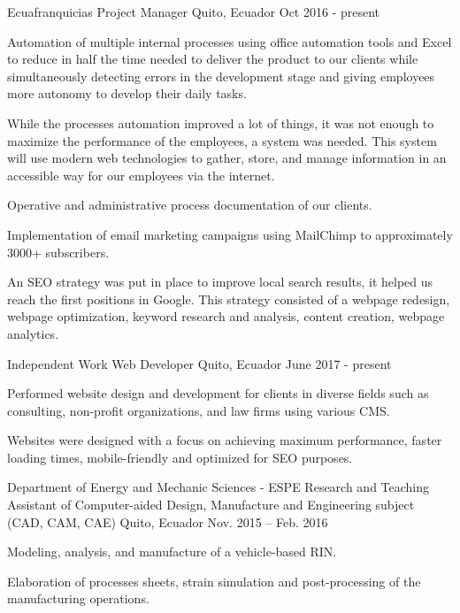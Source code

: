 
\begin{cventries}

  \cventry
    {Ecuafranquicias}
    {Project Manager}
    {Quito, Ecuador}
    {Oct 2016 - present}
    {
      \begin{cvitems}
        \item {Automation of multiple internal processes using oﬀice automation tools and Excel to reduce in half the time needed to deliver the product to our clients while simultaneously detecting errors in the development stage and giving employees more autonomy to develop their daily tasks.}
        \item {While the processes automation improved a lot of things, it was not enough to maximize the performance of the employees, a system was needed. This system will use modern web technologies to gather, store, and manage information in an accessible way for our employees via the internet.}
        \item {Operative and administrative process documentation of our clients.}
        \item {Implementation of email marketing campaigns using MailChimp to approximately 3000+ subscribers.}
        \item {An SEO strategy was put in place to improve local search results, it helped us reach the first positions in Google. This strategy consisted of a webpage redesign, webpage optimization, keyword research and analysis, content creation, webpage analytics.}
      \end{cvitems}
    }

    \cventry
      {Independent Work}
      {Web Developer}
      {Quito, Ecuador}
      {June 2017 - present}
      {
        \begin{cvitems}
          \item {Performed website design and development for clients in diverse fields such as consulting, non-profit organizations, and law firms using various CMS.}
          \item {Websites were designed with a focus on achieving maximum performance, faster loading times, mobile-friendly and optimized for SEO purposes.}                       
        \end{cvitems} 
      }

  \cventry
    {Department of Energy and Mechanic Sciences - ESPE}
    {Research and Teaching Assistant of Computer-aided Design, Manufacture and Engineering subject (CAD, CAM, CAE)	}
    {Quito, Ecuador}
    {Nov. 2015 – Feb. 2016}
    {
      \begin{cvitems}
        \item {Modeling, analysis, and manufacture of a vehicle-based RIN.}
        \item {Elaboration of processes sheets, strain simulation and post-processing of the manufacturing operations.}
      \end{cvitems}
    }
  

\end{cventries}
